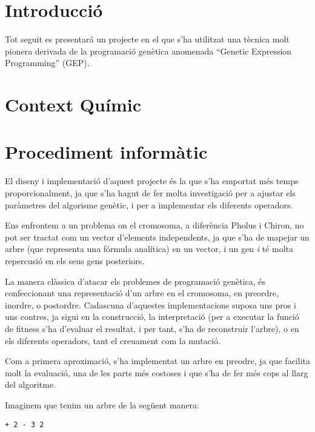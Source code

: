 \documentclass[titlepage,a4paper,12pt]{book}
\begin{document}
\tableofcontents  %

\section{Introducció} %
	\label{sec:Introduccio}
	Tot seguit es presentará un projecte en el que s'ha utilitzat una tècnica
	molt pionera derivada de la programació genètica anomenada ``Genetic
	Expression Programming'' (GEP).



\section{Context Químic} %
	\label{sec:Context Quimic}

\section{Procediment informàtic} %
\label{sec:Procediment informatic}

El diseny i implementació  d'aquest projecte és la que s'ha emportat més temps
proporcionalment, ja que s'ha hagut de fer molta investigació per a ajustar els
paràmetres del algorisme genètic, i per a implementar els diferents operadors.

Ens enfrontem a un problema on el cromosoma, a diferència Pholus i Chiron, no
pot ser tractat com un vector d'elements independents, ja que s'ha de mapejar un
arbre (que representa una fórmula analítica) en un vector, i un gen
\textit{i} té molta repercusió en els seus gens posteriors.

La manera clàssica d'atacar els problemes de programació genètica, és
confeccionant una representació d'un arbre en el cromosoma, en preordre,
inordre, o postordre.  Cadascuna d'aquestes implementacions suposa uns pros i
uns contres, ja sigui en la construcció, la interpretació (per a executar la
funció de fitness s'ha d'evaluar el resultat, i per tant, s'ha de reconstruir
l'arbre), o en els diferents operadors, tant el creuament com la mutació.

Com a primera aproximació, s'ha implementat un arbre en preodre, ja que facilita
molt la evaluació, una de les parts més costoses i que s'ha de fer més cops al
llarg del algoritme.

Imaginem que tenim un arbre de la següent manera:

\begin{verbatim}
+ 2 - 3 2
\end{verbatim}
\end{document}
